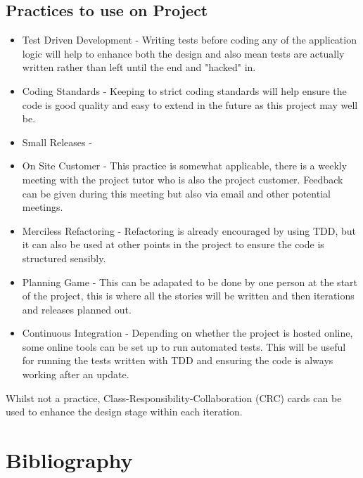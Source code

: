 \documentclass{article}
\begin{document}
\subsection{Practices to use on Project}
\begin{itemize}
	\item Test Driven Development - Writing tests before coding any of the application logic will help to enhance both the design and also mean tests are actually written rather than left until the end and "hacked" in.
	\item Coding Standards - Keeping to strict coding standards will help ensure the code is good quality and easy to extend in the future as this project may well be.
	\item Small Releases - 
	\item On Site Customer - This practice is somewhat applicable, there is a weekly meeting with the project tutor who is also the project customer. Feedback can be given during this meeting but also via email and other potential meetings.
	\item Merciless Refactoring - Refactoring is already encouraged by using TDD, but it can also be used at other points in the project to ensure the code is structured sensibly.
	\item Planning Game - This can be adapated to be done by one person at the start of the project, this is where all the stories will be written and then iterations and releases planned out.
	\item Continuous Integration - Depending on whether the project is hosted online, some online tools can be set up to run automated tests. This will be useful for running the tests written with TDD and ensuring the code is always working after an update.
\end{itemize}
Whilst not a practice, Class-Responsibility-Collaboration (CRC) cards can be used to enhance the design stage within each iteration.
\newpage

\section{Bibliography}


%
\end{document}
